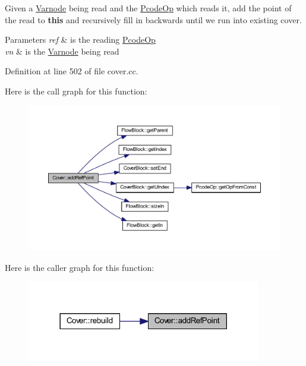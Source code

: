 Given a \mbox{\hyperlink{class_varnode}{Varnode}} being read and the \mbox{\hyperlink{class_pcode_op}{Pcode\+Op}} which reads it, add the point of the read to {\bfseries{this}} and recursively fill in backwards until we run into existing cover. 
\begin{DoxyParams}{Parameters}
{\em ref} & is the reading \mbox{\hyperlink{class_pcode_op}{Pcode\+Op}} \\
\hline
{\em vn} & is the \mbox{\hyperlink{class_varnode}{Varnode}} being read \\
\hline
\end{DoxyParams}


Definition at line 502 of file cover.\+cc.

Here is the call graph for this function\+:
\nopagebreak
\begin{figure}[H]
\begin{center}
\leavevmode
\includegraphics[width=350pt]{class_cover_ab456608e95995c8005aeac877fdac731_cgraph}
\end{center}
\end{figure}
Here is the caller graph for this function\+:
\nopagebreak
\begin{figure}[H]
\begin{center}
\leavevmode
\includegraphics[width=290pt]{class_cover_ab456608e95995c8005aeac877fdac731_icgraph}
\end{center}
\end{figure}
\mbox{\label{class_cover_a97eaa891151315273e20d54584001077}} 
